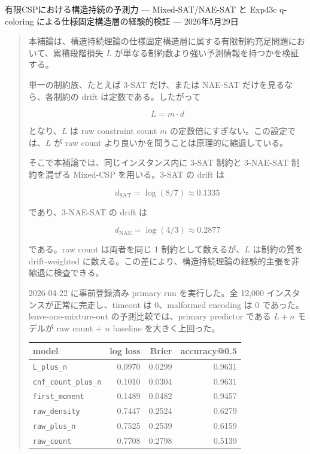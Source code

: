 \documentclass[12pt,a4paper]{article}
\begin{document}
\PaperTitleBlock
  {有限CSPにおける構造持続の予測力}
  {— Mixed-SAT/NAE-SAT と Exp43c q-coloring による仕様固定構造層の経験的検証 —}
  {2026年5月29日}

\begin{abstract}
本補論は、構造持続理論の仕様固定構造層に属する有限制約充足問題において、累積段階損失 \(L\) が単なる制約数より強い予測情報を持つかを検証する。

単一の制約族、たとえば 3-SAT だけ、または NAE-SAT だけを見るなら、各制約の drift は定数である。したがって

\[
L = m \cdot d
\]

となり、\(L\) は raw constraint count \(m\) の定数倍にすぎない。この設定では、\(L\) が raw count より良いかを問うことは原理的に縮退している。

そこで本補論では、同じインスタンス内に 3-SAT 制約と 3-NAE-SAT 制約を混ぜる Mixed-CSP を用いる。3-SAT の drift は

\[
d_{\mathrm{SAT}}=\log(8/7)\approx 0.1335
\]

であり、3-NAE-SAT の drift は

\[
d_{\mathrm{NAE}}=\log(4/3)\approx 0.2877
\]

である。raw count は両者を同じ 1 制約として数えるが、\(L\) は制約の質を drift-weighted に数える。この差により、構造持続理論の経験的主張を非縮退に検査できる。

2026-04-22 に事前登録済み primary run を実行した。全 12,000 インスタンスが正常に完走し、timeout は 0、malformed encoding は 0 であった。leave-one-mixture-out の予測比較では、primary predictor である \(L+n\) モデルが raw count + \(n\) baseline を大きく上回った。

{\def\LTcaptype{table} %
\begin{longtable}[]{@{}lrrr@{}}
\toprule\noalign{}
model & log loss & Brier & accuracy@0.5 \\
\midrule\noalign{}
\endhead
\bottomrule\noalign{}
\endlastfoot
\texttt{L\_plus\_n} & 0.0970 & 0.0299 & 0.9631 \\
\texttt{cnf\_count\_plus\_n} & 0.1010 & 0.0304 & 0.9631 \\
\texttt{first\_moment} & 0.1489 & 0.0482 & 0.9457 \\
\texttt{raw\_density} & 0.7447 & 0.2524 & 0.6279 \\
\texttt{raw\_plus\_n} & 0.7525 & 0.2539 & 0.6159 \\
\texttt{raw\_count} & 0.7708 & 0.2798 & 0.5139 \\
\end{longtable}
}


\end{abstract}
\end{document}
